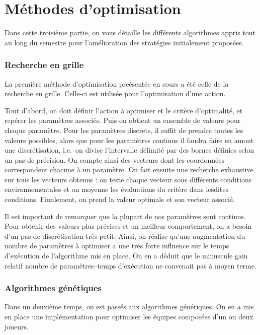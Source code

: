 \documentclass[12pt,a4paper]{article}
\begin{document}
\newpage

\part{M\'ethodes d'optimisation}
Dans cette troisi\`eme partie, on vous d\'etaille les diff\'erents algorithmes 
appris tout au long du semestre pour l'am\'elioration des strat\'egies 
initialement propos\'ees.

\section{Recherche en grille}
La premi\`ere m\'ethode d'optimisation pre\'esent\'ee en cours a \'et\'e 
celle de la recherche en grille. Celle-ci est utilis\'ee pour l'optimisation 
d'une 
action.

Tout d'abord, on doit d\'efinir l'action \`a optimiser et le crit\`ere 
d'optimalit\'e, et rep\'erer les param\`etres associ\'es. Puis on 
obtient un ensemble de valeurs pour chaque param\`etre. 
Pour les param\`etres discrets, il suffit de prendre toutes les valeurs 
possibles, alors que pour les param\`etres continus il faudra faire en amont 
une discr\'etisation, i.e.\ on divise l'intervalle d\'elimit\'e par des bornes 
d\'efinies selon un pas de pr\'ecision. On compte ainsi des vecteurs dont les 
coordonn\'ees correspondent chacune \`a un param\`etre. On fait ensuite une 
recherche exhaustive sur tous les vecteurs obtenus : on teste chaque vecteur 
sous diff\'erents conditions environnementales et on moyenne les \'evaluations 
 du crit\`ere dans lesdites conditions. Finalement, on prend la valeur optimale 
et son vecteur associ\'e.

Il est important de remarquer que la plupart de nos param\`etres sont continus. 
Pour obtenir des valeurs plus pr\'ecises et un meilleur comportement, on a 
besoin d'un pas de discr\'etisation tr\`es petit. Ainsi, on r\'ealise qu'une 
augmentation du nombre de param\`etres \`a optimiser a une tr\`es forte 
influence sur le temps d'ex\'ecution de l'algorithme mis en place. On 
en a d\'eduit que le minuscule gain relatif nombre de param\`etres--temps 
d'ex\'ecution ne convenait pas \`a moyen terme.

\section{Algorithmes g\'en\'etiques}
Dans un deuxi\`eme temps, on est pass\'es aux algorithmes g\'en\'etiques. On en 
a mis en place une impl\'ementation pour optimiser les \'equipes compos\'ees 
d'un ou deux joueurs.
\end{document}
